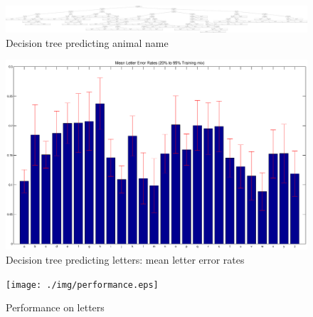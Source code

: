 \documentclass[	DIV=calc,%
				paper=a4,%
				fontsize=11pt,%
				twocolumn]{scrartcl}	 %
\begin{document}
\begin{figure}[h]
  \centering
  \caption{Decision tree predicting animal name}
  \label{7-4-gini}
  \includegraphics[width=1\textwidth]{./img/7-4-gini.jpg}
\end{figure}

\begin{figure}[h]
  \centering
  \caption{Decision tree predicting letters: mean letter error rates}
  \label{8-1-error}
  \includegraphics[width=1\textwidth]{./img/letter_error.eps}
\end{figure}

\begin{figure}[h]
  \centering
  \caption{Performance on letters}
  \label{8-2-performance}
  \texttt{[image: ./img/performance.eps]}
\end{figure}
\end{document}
